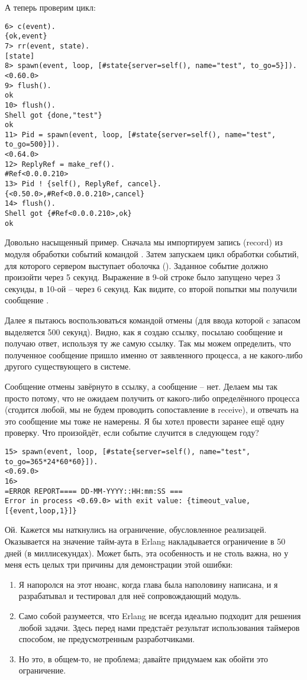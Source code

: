 А теперь проверим цикл:
\begin{lstlisting}[style=erlang]
6> c(event).
{ok,event}
7> rr(event, state).
[state]
8> spawn(event, loop, [#state{server=self(), name="test", to_go=5}]).
<0.60.0>
9> flush().
ok
10> flush().
Shell got {done,"test"}
ok
11> Pid = spawn(event, loop, [#state{server=self(), name="test", to_go=500}]).
<0.64.0>
12> ReplyRef = make_ref().
#Ref<0.0.0.210>
13> Pid ! {self(), ReplyRef, cancel}.
{<0.50.0>,#Ref<0.0.0.210>,cancel}
14> flush().
Shell got {#Ref<0.0.0.210>,ok}
ok
\end{lstlisting}

Довольно насыщенный пример.
Сначала мы импортируем запись (record) из модуля обработки событий командой .
Затем запускаем цикл обработки событий, для которого сервером выступает оболочка ().
Заданное событие должно произойти через 5 секунд.
Выражение в 9\--ой строке было запущено через 3 секунды, в 10\--ой \--- через 6 секунд.
Как видите, со второй попытки мы получили сообщение .

Далее я пытаюсь воспользоваться командой отмены (для ввода которой c запасом выделяется 500 секунд).
Видно, как я создаю ссылку, посылаю сообщение и получаю ответ, используя ту же самую ссылку.
Так мы можем определить, что полученное сообщение  пришло именно от заявленного процесса, а не какого\--либо другого существующего в системе.

Сообщение отмены завёрнуто в ссылку, а сообщение  \--- нет.
Делаем мы так просто потому, что не ожидаем получить  от какого\--либо определённого процесса (сгодится любой, мы не будем проводить сопоставление в receive), и отвечать на это сообщение мы тоже не намерены.
Я бы хотел провести заранее ещё одну проверку.
Что произойдёт, если событие случится в следующем году?
\begin{lstlisting}[style=erlang]
15> spawn(event, loop, [#state{server=self(), name="test", to_go=365*24*60*60}]).
<0.69.0>
16>
=ERROR REPORT==== DD-MM-YYYY::HH:mm:SS ===
Error in process <0.69.0> with exit value: {timeout_value,[{event,loop,1}]}
\end{lstlisting}

Ой.
Кажется мы наткнулись на ограничение, обусловленное реализацей.
Оказывается на значение тайм\--аута в Erlang накладывается ограничение в 50 дней (в миллисекундах).
Может быть, эта особенность и не столь важна, но у меня есть целых три причины для демонстрации этой ошибки:
\begin{enumerate}
    \item Я напоролся на этот нюанс, когда глава была наполовину написана, и я разрабатывал и тестировал для неё сопровождающий модуль.
    \item Само собой разумеется, что Erlang не всегда идеально подходит для решения любой задачи.
       Здесь перед нами предстаёт результат использования таймеров способом, не предусмотренным разработчиками.
    \item Но это, в общем\--то, не проблема; давайте придумаем как обойти это ограничение.
\end{enumerate}

